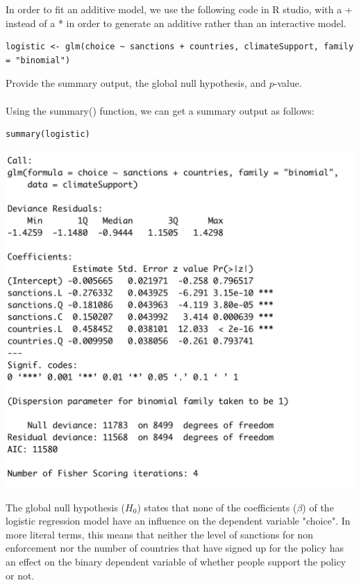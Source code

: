 \documentclass[12pt,letterpaper]{article}
\begin{document}
\noindent In order to fit an additive model, we use the following code in R studio, with a + instead of a * in order to generate an additive rather than an interactive model. 
\\
\begin{verbatim}
logistic <- glm(choice ~ sanctions + countries, climateSupport, family = "binomial")
\end{verbatim}

\noindent Provide the summary output, the global null hypothesis, and $p$-value. 
\\\\

\noindent Using the summary() function, we can get a summary output as follows:

\begin{verbatim}
summary(logistic)
\end{verbatim}

\includegraphics{logreg_output.png}
\newpage

\noindent 
The global null hypothesis ($H_0$) states that none of the coefficients ($\beta$) of the logistic regression model have an influence on the dependent variable "choice". In more literal terms, this means that neither the level of sanctions for non enforcement nor the number of countries that have signed up for the policy has an effect on the binary dependent variable of whether people support the policy or not. 
\\
\end{document}
